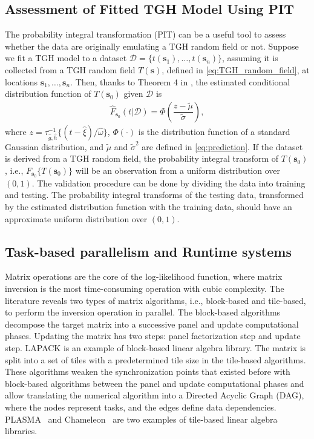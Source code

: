 \documentclass[conference]{IEEEtran}
\begin{document}
\subsection{Assessment of Fitted TGH Model Using PIT}
The probability integral transformation (PIT) can be a 
useful tool to assess whether the data are originally 
emulating a TGH random field or not. Suppose we fit a TGH 
model to a dataset $\mathcal{D} = \{t(\bm s_1),\ldots,t(\bm s_n)\}$, assuming it is collected from a TGH random field $T(\bm s)$, 
defined in \eqref{eq:TGH_random_field}, at locations $\bm s_1,\ldots,\bm s_n$. Then, thanks to Theorem 4 in \cite{xu2017tukey},
the estimated conditional distribution function of $T(\bm s_0)$ given $\mathcal{D}$ is
\begin{equation}
\begin{split}
\widehat{F}_{\bm s_0} (t| \mathcal{D}) = \Phi \left( \dfrac{z - \tilde{\mu}}{\tilde{\sigma}} \right),
\end{split}
\label{eq:CDF}
\end{equation}
where $z = \tau^{-1}_{\widehat{g},\widehat{h}} \{(t - \widehat{\xi})/\widehat{\omega}\}$, $\Phi(\cdot)$ is the distribution function of 
a standard Gaussian distribution, and $\tilde{\mu}$ and $\tilde{\sigma}^2$ are defined in \eqref{eq:prediction}. If the dataset is 
derived from a TGH random field, the probability 
integral transform of $T(\bm s_0)$, i.e., $ {F}_{\bm s_0}\{T(\bm s_0) \}$ will be an observation from a uniform distribution over $(0,1)$. The
validation procedure can be done by dividing the data into training and testing. The probability integral transforms of the testing data, 
transformed by the estimated distribution function 
with the training data, should have an approximate 
uniform distribution over $(0,1)$. 

\subsection{Task-based parallelism and Runtime systems}
Matrix operations are the core of the log-likelihood function, where matrix inversion is the most time-consuming operation with cubic complexity. The literature reveals two types of matrix algorithms, i.e., block-based and tile-based, to perform the inversion operation in parallel.  The block-based algorithms decompose the target matrix into a successive panel and
update computational phases. Updating the matrix has two steps: panel factorization step and update step. LAPACK is an example of block-based 
linear algebra library. The matrix is split into a set of tiles with a predetermined tile size in the tile-based algorithms. These algorithms weaken the synchronization points that existed before with block-based algorithms between the panel and update computational phases and allow translating the numerical algorithm into a Directed Acyclic Graph (DAG), where the
nodes represent tasks, and the edges define data dependencies. PLASMA~\cite{dongarra2019plasma} and Chameleon~\cite{chameleon-soft} are two examples of tile-based linear algebra libraries.
\end{document}
